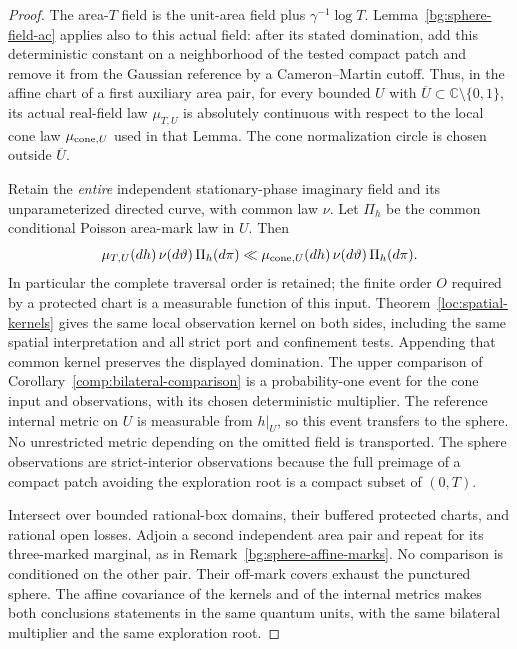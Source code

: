\begin{proof}
The area-$T$ field is the unit-area field plus
$\gamma^{-1}\log T$.  Lemma~\ref{bg:sphere-field-ac} applies also to
this actual field: after its stated domination, add this deterministic
constant on a neighborhood of the tested compact patch and remove it
from the Gaussian reference by a Cameron--Martin cutoff.  Thus, in
the affine chart of a first auxiliary area pair, for every bounded
$U$ with $\overline U\subset\mathbb C\setminus\{0,1\}$,
its actual real-field law $\mu_{T,U}$ is absolutely continuous with
respect to the local cone law $\mu_{{\rm cone},U}$ used in that Lemma.
The cone normalization circle is chosen outside $\overline U$.

Retain the \emph{entire} independent stationary-phase imaginary field
and its unparameterized directed curve, with common law $\nu$.
Let $\Pi_h$ be the common conditional Poisson area-mark law in $U$.
Then
\[
 \mu_{T,U}(dh)\,\nu(d\vartheta)\,\Pi_h(d\pi)
 \ll
 \mu_{{\rm cone},U}(dh)\,\nu(d\vartheta)\,\Pi_h(d\pi).
\]
In particular the complete traversal order is retained; the finite
order $O$ required by a protected chart is a measurable function of
this input.  Theorem~\ref{loc:spatial-kernels} gives the same local
observation kernel on both sides, including the same spatial
interpretation and all strict port and confinement tests.  Appending
that common kernel preserves the displayed domination.  The upper
comparison of Corollary~\ref{comp:bilateral-comparison} is a
probability-one event for the cone input and observations, with its
chosen deterministic multiplier.  The reference internal metric on
$U$ is measurable from $h|_U$, so this event transfers to the sphere.
No unrestricted metric depending on the omitted field is transported.
The sphere observations are strict-interior observations because the
full preimage of a compact patch avoiding the exploration root is a
compact subset of $(0,T)$.

Intersect over bounded rational-box domains, their buffered protected
charts, and rational open losses.  Adjoin a second independent area
pair and repeat for its three-marked marginal, as in
Remark~\ref{bg:sphere-affine-marks}.  No comparison is conditioned on
the other pair.  Their off-mark covers exhaust the punctured sphere.
The affine covariance of the kernels and of the internal metrics makes
both conclusions statements in the same quantum units, with the same
bilateral multiplier and the same exploration root.


\end{proof}
